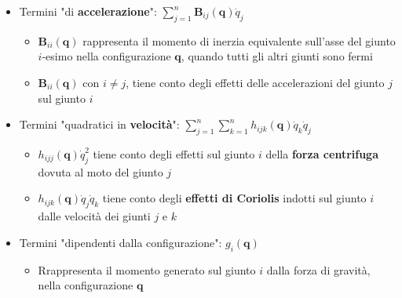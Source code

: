 \begin{itemize}
	\item Termini "di \textbf{accelerazione}": $\sum_{j=1}^n \bm{B}_{ij}(\bm{q}) \ddot{q}_j$
	\begin{itemize}
		\item $\bm{B}_{ii}(\bm{q})$ rappresenta il momento di inerzia equivalente sull’asse del giunto $i$-esimo nella configurazione $\bm{q}$, quando tutti gli altri giunti sono fermi
		\item $\bm{B}_{ii}(\bm{q})$ con $i\neq j$, tiene conto degli effetti delle accelerazioni del giunto $j$ sul giunto $i$
	\end{itemize}
	
	\item Termini "quadratici in \textbf{velocità}": $\sum_{j=1}^n \sum_{k=1}^n h_{ijk} (\bm{q}) \dot{q}_k \dot{q}_j$
	\begin{itemize}
		\item $h_{ijj}(\bm{q}) \dot{q}_j^2$ tiene conto degli effetti sul giunto $i$ della \textbf{forza centrifuga} dovuta al moto del giunto $j$
		\item $h_{ijk}(\bm{q}) \dot{q}_j \dot{q}_k$ tiene conto degli \textbf{effetti di Coriolis} indotti sul giunto $i$ dalle velocità dei giunti $j$ e $k$
	\end{itemize}
	
	\item Termini "dipendenti dalla configurazione": $g_i(\bm{q})$
	\begin{itemize}
		\item Rrappresenta il momento generato sul giunto $i$ dalla forza di gravità, nella configurazione $\bm{q}$
	\end{itemize}
\end{itemize}




